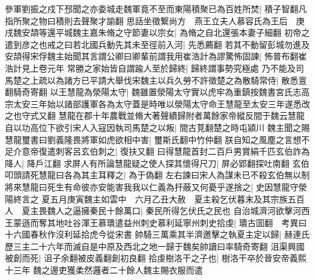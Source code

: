 參軍劉振之戍下邳聞之亦委城走魏軍竟不至而東陽積聚已為百姓所焚|{
	積子智翻凡指所聚之物曰積則去聲聚才諭翻}
思話坐徵繋尚方　燕王立夫人慕容氏為王后　庚戌魏安頡等還平城魏主嘉朱脩之守節妻以宗女|{
	為脩之自北還張本妻子細翻}
初帝之遣到彦之也戒之曰若北國兵動先其未至徑前入河|{
	先悉薦翻}
若其不動留彭城勿進及安頡得宋俘魏主始聞其言謂公卿曰卿輩前謂我用崔浩計為謬驚怖固諫|{
	怖普布翻崔浩計見上卷元年}
常勝之家始皆自謂踰人至於歸終|{
	歸終謂事勢究極處}
乃不能及司馬楚之上疏以為諸方已平請大舉伐宋魏主以兵久勞不許徵楚之為散騎常侍|{
	散悉亶翻騎奇寄翻}
以王慧龍為滎陽太守|{
	魏雖置滎陽太守實以虎牢為重鎮按魏書宮氏志高宗太安三年始以諸部護軍各為太守蓋是時唯以滎陽太守命王慧龍至太安三年遂悉改之也守式又翻}
慧龍在郡十年農戰並脩大著聲績歸附者萬餘家帝縱反間于魏云慧龍自以功高位下欲引宋人入寇因執司馬楚之以叛|{
	間古莧翻楚之時屯潁川}
魏主聞之賜慧龍璽書曰劉義隆畏將軍如虎欲相中害|{
	璽斯氏翻中竹仲翻}
朕自知之風塵之言想不足介意帝復遣刺客呂玄伯刺之|{
	復扶又翻}
曰得慧龍首封二百戶男賞絹千匹玄伯詐為降人|{
	降戶江翻}
求屏人有所論慧龍疑之使人探其懷得尺刀|{
	屏必郢翻探吐南翻}
玄伯叩頭請死慧龍曰各為其主耳釋之|{
	為于偽翻}
左右諫曰宋人為謀未已不殺玄伯無以制將來慧龍曰死生有命彼亦安能害我我以仁義為扞蔽又何憂乎遂捨之|{
	史因慧龍守滎陽終言之}
夏五月庚寅魏主如雲中　六月乙丑大赦　夏主殺乞伏暮末及其宗族五百人　夏主畏魏人之逼擁秦民十餘萬口|{
	秦民所得乞伏氏之民也}
自治城濟河欲擊河西王蒙遜而奪其地吐谷渾王慕璝遣益州刺史慕利延寧州刺史拾虔|{
	璝古囬翻　考異曰十六國春秋作沒利延拾虎今從宋書}
帥騎三萬乘其半濟邀擊之執夏主定以歸|{
	赫連氏歷三主二十六年而滅自是中原及西北之地一歸于魏矣帥讀曰率騎奇寄翻}
沮渠興國被創而死|{
	沮子余翻被皮義翻創初良翻}
拾虔樹洛干之子也|{
	樹洛干卒於晉安帝義熙十三年}
魏之邊吏獲柔然邏者二十餘人魏主賜衣服而遣

